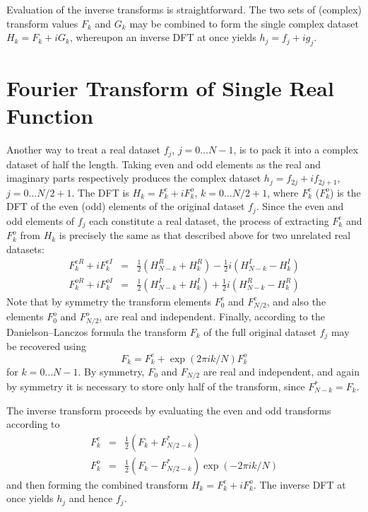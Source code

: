 \documentclass[dvips]{article}
\begin{document}
Evaluation of the inverse transforms is straightforward.  The two sets
of (complex) transform values $F_{k}$ and $G_{k}$ may be combined to
form the single complex dataset $H_{k} = F_{k} + iG_{k}$, whereupon an
inverse DFT at once yields $h_{j} = f_{j}+ig_{j}$.

\section*{Fourier Transform of Single Real Function}
Another way to treat a real dataset $f_{j}$, $j=0\ldots N-1$, is to pack it
into a complex dataset
of half the length.  Taking even and odd elements as the real and
imaginary parts respectively produces the complex dataset
$h_{j} = f_{2j}+if_{2j+1}$,
$j=0\ldots N/2+1$.  The DFT is $H_{k} = F_{k}^{e} + iF_{k}^{o}$,
$k=0\ldots N/2+1$, where $F_{k}^{e}$ ($F_{k}^{o}$) is the DFT of the
even (odd) elements of the original dataset $f_{j}$.  Since the even and
odd elements of $f_{j}$ each constitute a real dataset, the process of
extracting $F_{k}^{e}$ and $F_{k}^{o}$ from $H_{k}$ is precisely the
same as that described above for two unrelated real datasets:
\begin{eqnarray}
F_{k}^{eR} + iF_{k}^{eI} & = & \frac{1}{2}\left(H_{N-k}^{R}+H_{k}^{R}\right)
-\frac{1}{2}i\left(H_{N-k}^{I}-H_{k}^{I}\right) \nonumber \\
F_{k}^{oR} + iF_{k}^{oI} & = & \frac{1}{2}\left(H_{N-k}^{I}+H_{k}^{I}\right)
+\frac{1}{2}i\left(H_{N-k}^{R}-H_{k}^{R}\right) 
\end{eqnarray}
Note that by symmetry the transform elements $F_{0}^{e}$ and
$F_{N/2}^{e}$,
and also the elements $F_{0}^{o}$ and $F_{N/2}^{o}$, are real and independent.
Finally, according to the
Danielson--Lanczos formula the transform $F_{k}$ of the full original
dataset $f_{j}$ may be recovered using
\begin{equation}
F_{k} = F_{k}^{e} + \exp{(2\pi i k/N)}F_{k}^{o}
\end{equation}
for $k=0\ldots N-1$.  By symmetry, $F_{0}$ and $F_{N/2}$ are real and
independent, and again by symmetry it is necessary to store only half of the
transform, since $F_{N-k}^{*} = F_{k}$.

The inverse transform proceeds by evaluating the even and odd transforms
according to
\begin{eqnarray}
F_{k}^{e} & = & \frac{1}{2}\left(F_{k} + F_{N/2-k}^{*}\right) \nonumber \\
F_{k}^{o} & = & \frac{1}{2}\left(F_{k} - F_{N/2-k}^{*}\right)
\exp{(-2\pi i k/N)}
\end{eqnarray}
and then forming the combined transform $H_{k} = F_{k}^{e} +
iF_{k}^{o}$.  The inverse DFT at once yields $h_{j}$ and hence $f_{j}$.
\end{document}
